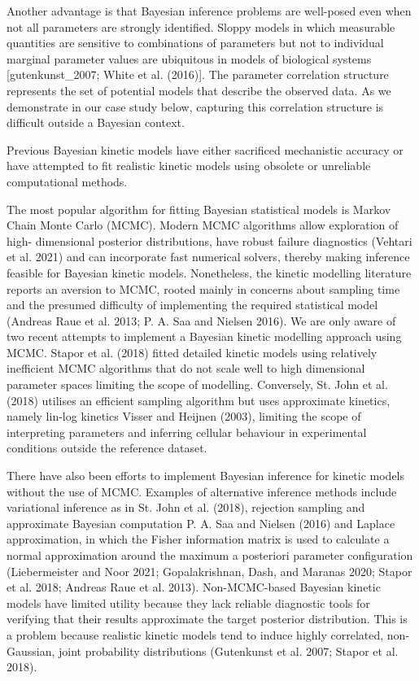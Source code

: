 \documentclass[
  letterpaper,
  DIV=11,
  numbers=noendperiod]{scrartcl}
\begin{document}
Another advantage is that Bayesian inference problems are well-posed
even when not all parameters are strongly identified. Sloppy models in
which measurable quantities are sensitive to combinations of parameters
but not to individual marginal parameter values are ubiquitous in models
of biological systems {[}gutenkunst\_2007; White et al. (2016){]}. The
parameter correlation structure represents the set of potential models
that describe the observed data. As we demonstrate in our case study
below, capturing this correlation structure is difficult outside a
Bayesian context.

Previous Bayesian kinetic models have either sacrificed mechanistic
accuracy or have attempted to fit realistic kinetic models using
obsolete or unreliable computational methods.

The most popular algorithm for fitting Bayesian statistical models is
Markov Chain Monte Carlo (MCMC). Modern MCMC algorithms allow
exploration of high- dimensional posterior distributions, have robust
failure diagnostics (Vehtari et al. 2021) and can incorporate fast
numerical solvers, thereby making inference feasible for Bayesian
kinetic models. Nonetheless, the kinetic modelling literature reports an
aversion to MCMC, rooted mainly in concerns about sampling time and the
presumed difficulty of implementing the required statistical model
(Andreas Raue et al. 2013; P. A. Saa and Nielsen 2016). We are only
aware of two recent attempts to implement a Bayesian kinetic modelling
approach using MCMC. Stapor et al. (2018) fitted detailed kinetic models
using relatively inefficient MCMC algorithms that do not scale well to
high dimensional parameter spaces limiting the scope of modelling.
Conversely, St. John et al. (2018) utilises an efficient sampling
algorithm but uses approximate kinetics, namely lin-log kinetics Visser
and Heijnen (2003), limiting the scope of interpreting parameters and
inferring cellular behaviour in experimental conditions outside the
reference dataset.

There have also been efforts to implement Bayesian inference for kinetic
models without the use of MCMC. Examples of alternative inference
methods include variational inference as in St. John et al. (2018),
rejection sampling and approximate Bayesian computation P. A. Saa and
Nielsen (2016) and Laplace approximation, in which the Fisher
information matrix is used to calculate a normal approximation around
the maximum a posteriori parameter configuration (Liebermeister and Noor
2021; Gopalakrishnan, Dash, and Maranas 2020; Stapor et al. 2018;
Andreas Raue et al. 2013). Non-MCMC-based Bayesian kinetic models have
limited utility because they lack reliable diagnostic tools for
verifying that their results approximate the target posterior
distribution. This is a problem because realistic kinetic models tend to
induce highly correlated, non-Gaussian, joint probability distributions
(Gutenkunst et al. 2007; Stapor et al. 2018).
\end{document}
